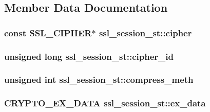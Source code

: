 \subsection{Member Data Documentation}
\hypertarget{structssl__session__st_ad28c676df9d108256549b35af21488ea}{
\subsubsection[{cipher}]{\setlength{\rightskip}{0pt plus 5cm}const {\bf S\-S\-L\-\_\-\-C\-I\-P\-H\-E\-R}$\ast$ ssl\-\_\-session\-\_\-st\-::cipher}}\label{structssl__session__st_ad28c676df9d108256549b35af21488ea}
\hypertarget{structssl__session__st_a8701f3c1016dda3c59248560eaaddeb6}{
\subsubsection[{cipher\-\_\-id}]{\setlength{\rightskip}{0pt plus 5cm}unsigned long ssl\-\_\-session\-\_\-st\-::cipher\-\_\-id}}\label{structssl__session__st_a8701f3c1016dda3c59248560eaaddeb6}
\hypertarget{structssl__session__st_a2da44d606e0a955ab8f930c2def1ba45}{
\subsubsection[{compress\-\_\-meth}]{\setlength{\rightskip}{0pt plus 5cm}unsigned int ssl\-\_\-session\-\_\-st\-::compress\-\_\-meth}}\label{structssl__session__st_a2da44d606e0a955ab8f930c2def1ba45}
\hypertarget{structssl__session__st_a1a25c1960884dde3163cc9f98ec942fe}{
\subsubsection[{ex\-\_\-data}]{\setlength{\rightskip}{0pt plus 5cm}C\-R\-Y\-P\-T\-O\-\_\-\-E\-X\-\_\-\-D\-A\-T\-A ssl\-\_\-session\-\_\-st\-::ex\-\_\-data}}\label{structssl__session__st_a1a25c1960884dde3163cc9f98ec942fe}
